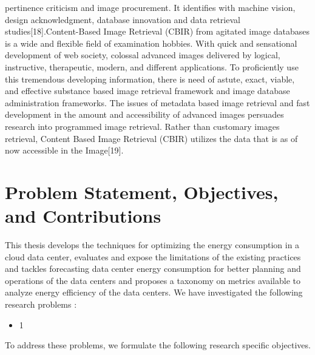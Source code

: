 \documentclass[review]{elsarticle}
\begin{document}
pertinence criticism and image procurement. It identifies with machine vision, design acknowledgment, database innovation and data retrieval studies[18].Content-Based Image Retrieval (CBIR) from agitated image databases is a wide and flexible field of examination hobbies. With quick and sensational development of web society, colossal advanced images delivered by logical, instructive, therapeutic, modern, and different applications. To proficiently use this tremendous developing information, there is need of astute, exact, viable, and effective substance based image retrieval framework and image database administration frameworks. The issues of metadata based image retrieval and fast development in the amount and accessibility of advanced images persuades research into programmed image retrieval. Rather than customary images retrieval, Content Based Image Retrieval (CBIR) utilizes the data that is as of now accessible in the Image[19].


\section{Problem Statement, Objectives, and Contributions}  
This thesis develops the techniques for optimizing the energy consumption in a cloud data center, evaluates and expose the limitations of the existing practices and tackles forecasting data center energy consumption for better planning and operations of the data centers and proposes a taxonomy on metrics available to analyze energy efficiency of the data centers. We have investigated the following research problems :
\begin{itemize}
	\item 1
\end{itemize}


To address these problems, we formulate the following   research specific  objectives.
\end{document}

